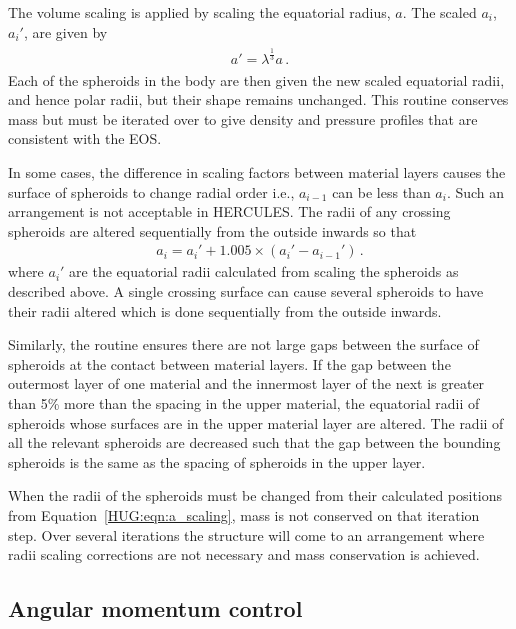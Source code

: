 \documentclass[11pt, oneside]{article}   	%
\begin{document}
The volume scaling is applied by scaling the equatorial radius, $a$.
The scaled $a_i$, $a_i'$, are given by 
%
\begin{align}
\begin{aligned}
a'=\lambda^{\frac{1}{3}} a \,.
\label{HUG:eqn:a_scaling}
\end{aligned}
\end{align}
%
Each of the spheroids in the body are then given the new scaled equatorial radii, and hence polar radii, but their shape remains unchanged. 
This routine conserves mass but must be iterated over to give density and pressure profiles that are consistent with the EOS.

In some cases, the difference in scaling factors between material layers causes the surface of spheroids to change radial order i.e., $a_{i-1}$ can be less than $a_{i}$. 
Such an arrangement is not acceptable in HERCULES.
The radii of any crossing spheroids are altered sequentially from the outside inwards so that
%
\begin{align}
a_i=a_i'+1.005 \times (a_i'-a_{i-1}') \,.
\end{align}
%
where $a_i'$ are the equatorial radii calculated from scaling the spheroids as described above.
A single crossing surface can cause several spheroids to have their radii altered which is done sequentially from the outside inwards.

Similarly, the routine ensures there are not large gaps between the surface of spheroids at the contact between material layers. 
If the gap between the outermost layer of one material and the innermost layer of the next is greater than 5\% more than the  spacing in the upper material, the equatorial radii of spheroids whose surfaces are in the upper material layer are altered. 
The radii of all the relevant spheroids are decreased such that the gap between the bounding spheroids is the same as the spacing of spheroids in the upper layer.

When the radii of the spheroids must be changed from their calculated positions from Equation~\ref{HUG:eqn:a_scaling}, mass is not conserved on that iteration step. 
Over several iterations the structure will come to an arrangement where radii scaling corrections are not necessary and mass conservation is achieved.

\subsection{Angular momentum control}
\label{HUG:sec:AMconc}
\end{document}
